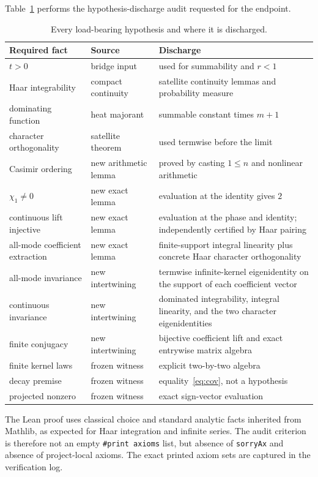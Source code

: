 \documentclass[11pt]{article}
\theoremstyle{definition}
\theoremstyle{remark}
\begin{document}
\par\medskip
\noindent
Table~\ref{tab:hypotheses} performs the hypothesis-discharge audit requested
for the endpoint.

\begin{table}[ht]
\centering
\small
\begin{tabular}{p{}p{}p{}}
\toprule
Required fact & Source & Discharge \\
\midrule
$t>0$ & bridge input & used for summability and $r<1$ \\
Haar integrability & compact continuity & satellite continuity lemmas and
probability measure \\
dominating function & heat majorant & summable constant times $m+1$ \\
character orthogonality & satellite theorem & used termwise before the limit \\
Casimir ordering & new arithmetic lemma & proved by casting $1\le n$ and
nonlinear arithmetic \\
$\chi_1\ne0$ & new exact lemma & evaluation at the identity gives $2$ \\
continuous lift injective & new exact lemma & evaluation at the phase and
identity; independently certified by Haar pairing \\
all-mode coefficient extraction & new exact lemma & finite-support integral
linearity plus concrete Haar character orthogonality \\
all-mode invariance & new intertwining & termwise infinite-kernel eigenidentity
on the support of each coefficient vector \\
continuous invariance & new intertwining & dominated integrability, integral
linearity, and the two character eigenidentities \\
finite conjugacy & new intertwining & bijective coefficient lift and exact
entrywise matrix algebra \\
finite kernel laws & frozen witness & explicit two-by-two algebra \\
decay premise & frozen witness & equality~\eqref{eq:cov}, not a hypothesis \\
projected nonzero & frozen witness & exact sign-vector evaluation \\
\bottomrule
\end{tabular}
\caption{Every load-bearing hypothesis and where it is discharged.}
\label{tab:hypotheses}
\end{table}

The Lean proof uses classical choice and standard analytic facts inherited
from Mathlib, as expected for Haar integration and infinite series.  The audit
criterion is therefore not an empty \texttt{\#print axioms} list, but absence
of \texttt{sorryAx} and absence of project-local axioms.  The exact printed
axiom sets are captured in the verification log.
\end{document}
